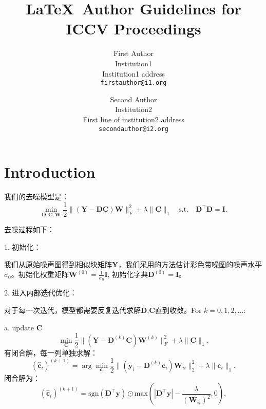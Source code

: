 \documentclass[10pt,twocolumn,letterpaper]{article}
\begin{document}
\title{\LaTeX\ Author Guidelines for ICCV Proceedings}

\author{First Author\\
Institution1\\
Institution1 address\\
{\tt\small firstauthor@i1.org}
\and
Second Author\\
Institution2\\
First line of institution2 address\\
{\tt\small secondauthor@i2.org}
}

\maketitle


\section{Introduction}

我们的去噪模型是：
\begin{equation}
\min_{\mathbf{D},\mathbf{C},\mathbf{W}}\frac{1}{2}\|(\mathbf{Y}-\mathbf{D}\mathbf{C})\mathbf{W}\|_{F}^{2}
+
\lambda\|\mathbf{C}\|_{1}
\quad
\text{s.t.}
\quad
\mathbf{D}^{\top}\mathbf{D} =\mathbf{I}. 
\end{equation}

去噪过程如下：

1. 初始化：

我们从原始噪声图得到相似块矩阵$\mathbf{Y}$，我们采用\cite{Chen2015ICCV}的方法估计彩色带噪图的噪声水平$\sigma_{0}$。初始化权重矩阵$\mathbf{W}^{(0)}=\frac{1}{\sigma_{0}}\mathbf{I}$, 初始化字典$\mathbf{D}^{(0)}=\mathbf{I}$。

2. 进入内部迭代优化：

对于每一次迭代，模型都需要反复迭代求解$\mathbf{D}$,$\mathbf{C}$直到收敛。For $k=0,1,2,...$:

a. update $\mathbf{C}$
\begin{equation}
\min_{\mathbf{C}}\frac{1}{2}\|(\mathbf{Y}-\mathbf{D}^{(k)}\mathbf{C})\mathbf{W}^{(k)}\|_{F}^{2}
+
\lambda\|\mathbf{C}\|_{1}.
\end{equation}
有闭合解，每一列单独求解：
\begin{equation}
(\hat{\mathbf{c}}_{i})^{(k+1)}
=
\arg\min_{\mathbf{c}_{i}}\frac{1}{2}\|(\mathbf{y}_{i}-\mathbf{D}^{(k)}\mathbf{c}_{i})\mathbf{W}_{ii}\|_{2}^{2}
+
\lambda\|\mathbf{c}_{i}\|_{1}.
\end{equation}
闭合解为：
\begin{equation}
(\hat{\mathbf{c}}_{i})^{(k+1)}
=
\text{sgn}(\mathbf{D^{\top}y}) 
\odot 
\text{max}(|\mathbf{D^{\top}y}|-\frac{\lambda}{(\mathbf{W}_{ii})^{2}},0),
\end{equation}
\end{document}
